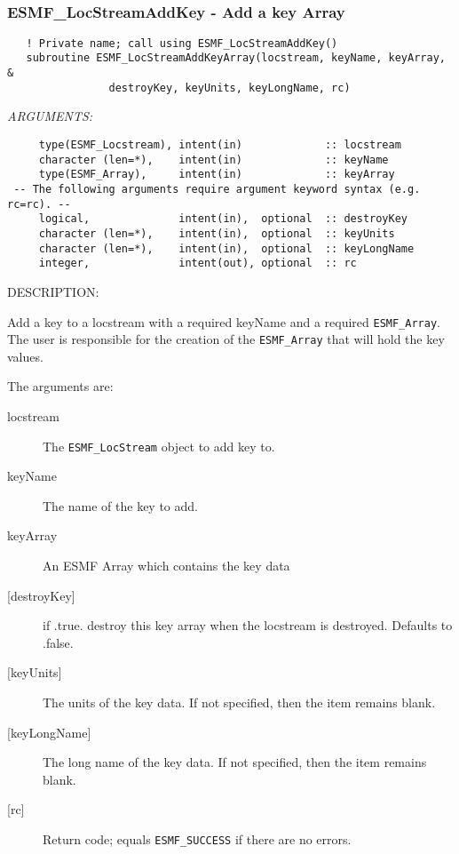 \mbox{}\hrulefill\ 
 
\subsubsection [ESMF\_LocStreamAddKey] {ESMF\_LocStreamAddKey - Add a key Array }


 
\begin{verbatim}   ! Private name; call using ESMF_LocStreamAddKey()
   subroutine ESMF_LocStreamAddKeyArray(locstream, keyName, keyArray, &
                destroyKey, keyUnits, keyLongName, rc)\end{verbatim}{\em ARGUMENTS:}
\begin{verbatim}     type(ESMF_Locstream), intent(in)             :: locstream
     character (len=*),    intent(in)             :: keyName
     type(ESMF_Array),     intent(in)             :: keyArray
 -- The following arguments require argument keyword syntax (e.g. rc=rc). --
     logical,              intent(in),  optional  :: destroyKey
     character (len=*),    intent(in),  optional  :: keyUnits 
     character (len=*),    intent(in),  optional  :: keyLongName 
     integer,              intent(out), optional  :: rc\end{verbatim}
{\sf DESCRIPTION:\\ }


   Add a key to a locstream with a required keyName and a required 
   {\tt ESMF\_Array}.  The user is responsible for the creation of the 
   {\tt ESMF\_Array} that will hold the key values.
  
   The arguments are:
   \begin{description}
   \item [locstream]
   The {\tt ESMF\_LocStream} object to add key to.
   \item [keyName]
   The name of the key to add. 
   \item [keyArray]
   An ESMF Array which contains the key data
   \item [{[destroyKey]}]
   if .true. destroy this key array when the locstream is destroyed.
   Defaults to .false.
   \item [{[keyUnits]}]
   The units of the key data. 
   If not specified, then the item remains blank.  
   \item [{[keyLongName]}]
   The long name of the key data. 
   If not specified, then the item remains blank.  
   \item [{[rc]}]
   Return code; equals {\tt ESMF\_SUCCESS} if there are no errors.
   \end{description} 
 
